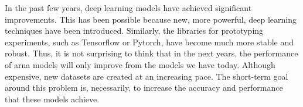 

In the past few years, deep learning models have achieved
significant improvements. This has been possible because
new, more powerful, deep learning techniques have been
introduced. Similarly, the libraries for prototyping
experiments, such as Tensorflow or Pytorch, have become much
more stable and robust. Thus, it is not surprising to think
that in the next years, the performance of \gls{arna}
models will only improve from the models we have today.
Although expensive, new datasets are created at an
increasing pace. The short-term goal around this problem is,
necessarily, to increase the accuracy and performance that
these models achieve.
